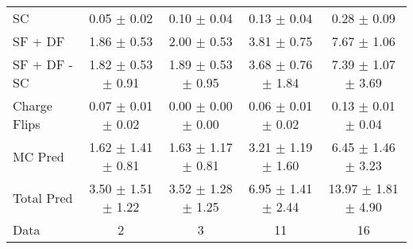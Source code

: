 \begin{tabular}{l|cccc}
                                 SC &  0.05 $\pm$  0.02 &  0.10 $\pm$  0.04 &  0.13 $\pm$  0.04 &  0.28 $\pm$  0.09 \\
                            SF + DF &  1.86 $\pm$  0.53 &  2.00 $\pm$  0.53 &  3.81 $\pm$  0.75 &  7.67 $\pm$  1.06 \\
\hline
                       SF + DF - SC &  1.82 $\pm$  0.53 $\pm$  0.91 &  1.89 $\pm$  0.53 $\pm$  0.95 &  3.68 $\pm$  0.76 $\pm$  1.84 &  7.39 $\pm$  1.07 $\pm$  3.69 \\
\hline\hline
                       Charge Flips &  0.07 $\pm$  0.01 $\pm$  0.02 &  0.00 $\pm$  0.00 $\pm$  0.00 &  0.06 $\pm$  0.01 $\pm$  0.02 &  0.13 $\pm$  0.01 $\pm$  0.04 \\
\hline
                            MC Pred &  1.62 $\pm$  1.41 $\pm$  0.81 &  1.63 $\pm$  1.17 $\pm$  0.81 &  3.21 $\pm$  1.19 $\pm$  1.60 &  6.45 $\pm$  1.46 $\pm$  3.23 \\
\hline
                         Total Pred &  3.50 $\pm$  1.51 $\pm$  1.22 &  3.52 $\pm$  1.28 $\pm$  1.25 &  6.95 $\pm$  1.41 $\pm$  2.44 & 13.97 $\pm$  1.81 $\pm$  4.90 \\
\hline\hline
                               Data &     2 &     3 &    11 &    16 \\
\hline\hline
\end{tabular}

